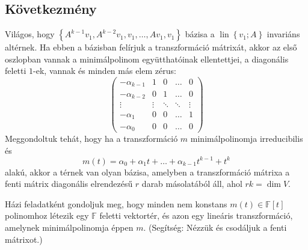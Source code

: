 \documentclass[9pt, a4paper, showtrims]{memoir}
\theoremstyle{plain}
\theoremstyle{remark}
\theoremstyle{definition}
\DeclareMathOperator{\lin}{lin}
\begin{document}
    \subsection{Következmény}
    Világos, hogy 
    \(
    \left\{ 
        A^{k-1}v_1, A^{k-2}v_1,v_1,\dots,Av_1,v_1 
    \right\}
    \)
    bázisa a $\lin\left\{ v_1;A \right\}$
    invariáns altérnek.
    Ha ebben a bázisban felírjuk a transzformáció mátrixát, 
    akkor az első oszlopban vannak a minimálpolinom együtthatóinak ellentettjei,
    a diagonális feletti $1$-ek, vannak és minden más elem zérus:
    \[
        \begin{pmatrix}
            -\alpha_{k-1}&1&0&\dots&0\\
            -\alpha_{k-2}&0&1&\dots&0\\
            \vdots&\vdots&\ddots&\ddots&\vdots\\
            -\alpha_{1}&0&0&\dots&1\\
            -\alpha_{0}&0&0&\dots&0
        \end{pmatrix}
    \]
    Meggondoltuk tehát, hogy ha a transzformáció $m$ minimálpolinomja irreducibilis és
    \[m\left( t \right)
        =\alpha_0+\alpha_1t+\dots+\alpha_{k-1}t^{k-1}+t^k
    \]
    alakú, akkor a térnek van olyan bázisa, amelyben a transzformáció mátrixa a fenti mátrix
    diagonális elrendezésű $r$ darab másolatából áll, ahol $rk=\dim V$.

    Házi feladatként gondoljuk meg, hogy minden nem konstans $m\left( t \right)\in\mathbb{F}\left[ t \right]$ 
    polinomhoz létezik egy $\mathbb{F}$ feletti vektortér, és azon egy lineáris transzformáció, 
    amelynek minimálpolinomja éppen $m$.
    ({\footnotesize Segítség: Nézzük és csodáljuk a fenti mátrixot.})
\end{document}
